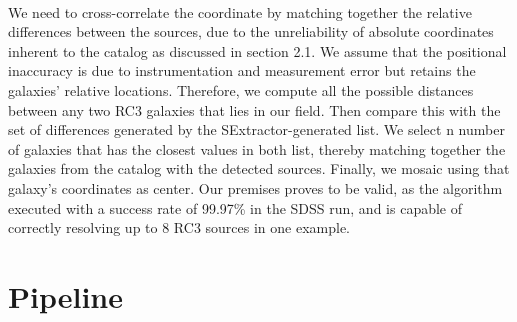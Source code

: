 \documentclass[5p]{elsarticle}
\begin{document}
\\
\indent  We need to cross-correlate the coordinate by matching together the relative differences between the sources, due to the unreliability of absolute coordinates inherent to the catalog as discussed in section 2.1. We assume that the positional inaccuracy is due to  instrumentation and measurement error but retains the galaxies' relative locations.  %
Therefore, we compute all the possible distances between any two RC3 galaxies that lies in our field. Then compare this with the set of differences generated by the SExtractor-generated list. We select n number of galaxies that has the closest values in both list, thereby matching together the galaxies from the catalog  with the detected sources. Finally, we mosaic using that galaxy's coordinates as center. Our premises proves to be valid, as the algorithm executed with a success rate of 99.97\% in the SDSS run, and is capable of correctly resolving up to 8 RC3 sources in one example.
\section{Pipeline}
\end{document}
